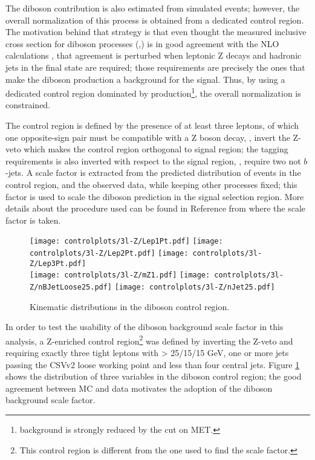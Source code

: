 The diboson contribution is also estimated from simulated events; however, the overall normalization of this process is obtained from a dedicated control region. The motivation behind that strategy is that even thought the measured inclusive cross section for diboson processes (\WZ,\ZZ) is in good agreement with the NLO calculations \cite{CMS_AN_2017-029}, that agreement is perturbed when leptonic Z decays and hadronic jets in the final state are required; those requirements are precisely the ones that make the diboson production a background for the \tHq signal. Thus, by using a dedicated control region dominated by \WZ production\footnote{\ZZ background is strongly reduced by the cut on MET.}, the overall normalization is constrained.

The control region is defined by the presence of at least three leptons, of which one opposite-sign pair must be compatible with a Z boson decay, \ie, invert the Z-veto which makes the control region orthogonal to signal region; the \bjet tagging requirements is also inverted with respect to the signal region, \ie, require two not $b$-jets. A scale factor is extracted from the predicted distribution of \WZ events in the control region, and the observed data, while keeping other processes fixed; this factor is used to scale the diboson prediction in the signal selection region. More details about the procedure used can be found in Reference \cite{CMS_AN_2017-029} from where the scale factor is taken.

\begin{figure} [!h]
\centering
        \texttt{[image: controlplots/3l-Z/Lep1Pt.pdf]}
        \texttt{[image: controlplots/3l-Z/Lep2Pt.pdf]}
        \texttt{[image: controlplots/3l-Z/Lep3Pt.pdf]} \\
        \texttt{[image: controlplots/3l-Z/mZ1.pdf]}
        \texttt{[image: controlplots/3l-Z/nBJetLoose25.pdf]}
        \texttt{[image: controlplots/3l-Z/nJet25.pdf]}
\caption{Kinematic distributions in the diboson control region.}
\label{fig:3lzcontrol}
\end{figure}
              
In order to test the usability of the diboson background scale factor in this analysis, a Z-enriched control region\footnote{This control region is different from the one used to find the scale factor.} was defined by inverting the Z-veto and requiring exactly three tight leptons with \pt > 25/15/15 GeV, one or more jets passing the CSVv2 loose working point and less than four central jets. Figure \ref{fig:3lzcontrol} shows the distribution of three variables in the diboson control region; the good agreement between MC and data motivates the adoption of the diboson background scale factor.


